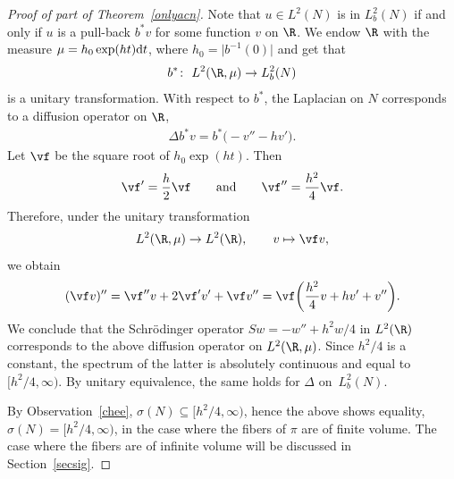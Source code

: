 \begin{proof}[Proof of part of Theorem~\ref{onlyacn}]
Note that $u\in L^2(N)$ is in $L^2_b(N)$ if and only if $u$ is a pull-back $b^*v$ for some function $v$ on $\R$.
We endow $\R$ with the measure $\mu=h_0\exp(ht){\rm d}t$,
where $h_0=\big|b^{-1}(0)\big|$ and get that
\begin{align*}%
	b^* \colon \ L^2(\R,\mu) \to L^2_b(N)
\end{align*}
is a unitary transformation.
With respect to $b^*$, the Laplacian on $N$ corresponds to a diffusion operator on $\R$,
\begin{align*}%
	\Delta b^*v = b^*\bigl(- v'' - hv'\bigr).
\end{align*}
Let $\vf$ be the square root of $h_0\exp(ht)$.
Then
\begin{align*}%
	\vf' = \frac{h}2\vf \qquad\text{and}\qquad \vf'' = \frac{h^2}4\vf.
\end{align*}
Therefore, under the unitary transformation
\begin{align*}
	L^2(\R,\mu) \to L^2(\R), \qquad v \mapsto \vf v,
\end{align*}
we obtain
\begin{align*}
	(\vf v)'' = \vf''v +2\vf'v' + \vf v'' = \vf\biggl(\frac{h^2}4 v + hv' + v''\biggr).
\end{align*}
We conclude that the Schr\"odinger operator $Sw=-w''+h^2w/4$ in $L^2(\R)$
corresponds to the above diffusion operator on $L^2(\R,\mu)$.
Since $h^2/4$ is a constant, the spectrum of the latter is absolutely continuous and equal to $\bigl[h^2/4,\infty\bigr)$.
By unitary equivalence, the same holds for $\Delta$ on~$L^2_b(N)$.

By Observation~\ref{chee}, $\sigma(N)\subseteq\bigl[h^2/4,\infty\bigr)$, hence the above shows equality,
$\sigma(N)=\bigl[h^2/4,\infty\bigr)$, in the case where the fibers of $\pi$ are of finite volume.
The case where the fibers are of infinite volume will be discussed in Section~\ref{secsig}.
\end{proof}
